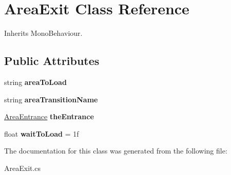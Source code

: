 \hypertarget{class_area_exit}{}\section{Area\+Exit Class Reference}
\label{class_area_exit}


Inherits Mono\+Behaviour.

\subsection*{Public Attributes}
\begin{DoxyCompactItemize}
\item 
\mbox{\label{class_area_exit_a65bd73fdceb7d1e4fe6cb724edba9066}} 
string {\bfseries area\+To\+Load}
\item 
\mbox{\label{class_area_exit_aa4e3f653dfb13bda67411e9625dad866}} 
string {\bfseries area\+Transition\+Name}
\item 
\mbox{\label{class_area_exit_aaec6dbb144e277e1663831d06d936b18}} 
\mbox{\hyperlink{class_area_entrance}{Area\+Entrance}} {\bfseries the\+Entrance}
\item 
\mbox{\label{class_area_exit_aa77f6f66cadf608fba934342d717b57c}} 
float {\bfseries wait\+To\+Load} = 1f
\end{DoxyCompactItemize}


The documentation for this class was generated from the following file\+:\begin{DoxyCompactItemize}
\item 
Area\+Exit.\+cs\end{DoxyCompactItemize}
